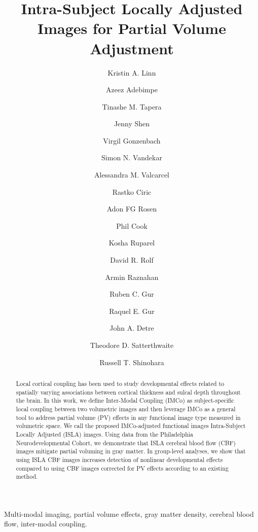 \documentclass[review]{elsarticle}
\begin{document}
\begin{frontmatter}

\title{\large \bf Intra-Subject Locally Adjusted Images for Partial Volume Adjustment}  

\author[biostatAddress,cbicaAddress]{Kristin A. Linn}
\author[psychAddress]{Azeez Adebimpe}
\author[psychAddress]{Tinashe M. Tapera}
\author[biostatAddress]{Jenny Shen}
\author[biostatAddress]{Virgil Gonzenbach}
\author[vandyAddress]{Simon N. Vandekar}
\author[biostatAddress]{Alessandra M. Valcarcel}
\author[psychAddress]{Rastko Ciric}
\author[psychAddress]{Adon FG Rosen}
\author[psychAddress]{Phil Cook}
\author[psychAddress]{Kosha Ruparel}
\author[psychAddress]{David R. Rolf}
\author[arminAddress]{Armin Raznahan}
\author[psychAddress]{Ruben C. Gur}
\author[psychAddress]{Raquel E. Gur}
\author[psychAddress]{John A. Detre}
\author[psychAddress,cbicaAddress]{Theodore D. Satterthwaite}
\author[biostatAddress,cbicaAddress]{Russell T. Shinohara}

\address[biostatAddress]{Penn Statistics in Imaging and Visualization Center, Department of Biostatistics, Epidemiology, and Informatics, University of Pennsylvania, Philadelphia, PA, USA}
\address[cbicaAddress]{Center for Biomedical Imaging Computing and Analytics, University of Pennsylvania, Philadelphia, PA, USA}
\address[psychAddress]{Department of Psychiatry, Perelman School of
  Medicine, University of Pennsylvania, Philadelphia, PA, USA}
\address[vandyAddress]{Department of Biostatistics, Vanderbilt University, Nashville, TN, USA}
\address[arminAddress]{Developmental Neurogenomics Unit, National Institute of Mental Health, Bethesda, MD 20814}

\begin{abstract}
Local cortical coupling has been used to study developmental effects related to spatially varying associations between cortical thickness and sulcal depth throughout the brain. In this work, we define Inter-Modal Coupling (IMCo) as subject-specific local coupling between two volumetric images and then leverage IMCo as a general tool to address partial volume (PV) effects in any functional image type measured in volumetric space. We call the proposed IMCo-adjusted functional images Intra-Subject Locally Adjusted (ISLA) images. Using data from the Philadelphia Neurodevelopmental Cohort, we demonstrate that ISLA cerebral blood flow (CBF) images mitigate partial voluming in gray matter. In group-level analyses, we show that using ISLA CBF images increases detection of nonlinear developmental effects compared to using CBF images corrected for PV effects according to an existing method. 
\end{abstract}

\begin{keyword}
Multi-modal imaging, partial volume effects, gray matter density, cerebral blood flow, inter-modal coupling. 
\end{keyword}

\end{frontmatter}
\end{document}
